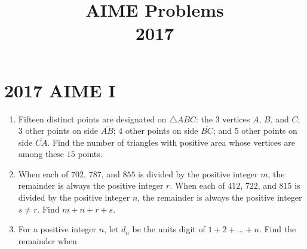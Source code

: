 \documentclass{article}
\title{AIME Problems \\ 2017}
\date{}
\begin{document}
\maketitle\thispagestyle{fancy}\newpage\section*{2017 AIME I}
\begin{enumerate}[label=\arabic*., itemsep=0.5em]
\item Fifteen distinct points are designated on \(\triangle ABC\): the 3 vertices \(A\), \(B\), and \(C\); \(3\) other points on side \(\overline{AB}\); \(4\) other points on side \(\overline{BC}\); and \(5\) other points on side \(\overline{CA}\). Find the number of triangles with positive area whose vertices are among these \(15\) points.\par \vspace{0.5em}\item When each of \(702\), \(787\), and \(855\) is divided by the positive integer \(m\), the remainder is always the positive integer \(r\). When each of \(412\), \(722\), and \(815\) is divided by the positive integer \(n\), the remainder is always the positive integer \(s \neq r\). Find \(m+n+r+s\).\par \vspace{0.5em}\item For a positive integer \(n\), let \(d_n\) be the units digit of \(1 + 2 + \dots + n\). Find the remainder when


\end{enumerate}
\end{document}
